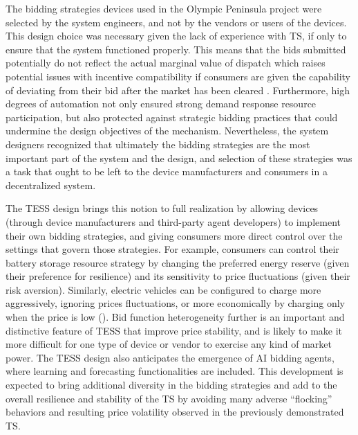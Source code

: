 The bidding strategies devices used in the Olympic Peninsula project were selected by the system engineers, and not by the vendors or users of the devices. This design choice was necessary given the lack of experience with TS, if only to ensure that the system functioned properly. 
This means that the bids submitted potentially do not reflect the actual marginal value of dispatch which raises potential issues with incentive compatibility if consumers are given the capability of deviating from their bid after the market has been cleared \citep{li2020transactive}. 
Furthermore, high degrees of automation not only ensured strong demand response resource participation, but also protected against strategic bidding practices that could undermine the design objectives of the mechanism.
Nevertheless, the system designers recognized that ultimately the bidding strategies are the most important part of the system and the design, and selection of these strategies was a task that ought to be left to the device manufacturers and consumers in a decentralized system.

The TESS design brings this notion to full realization by allowing devices (through device manufacturers and third-party agent developers) to implement their own bidding strategies, and giving consumers more direct control over the settings that govern those strategies. For example, consumers can control their battery storage resource strategy by changing the preferred energy reserve (given their preference for resilience) and its sensitivity to price fluctuations (given their risk aversion).  Similarly, electric vehicles can be configured to charge more aggressively, ignoring prices fluctuations, or more economically by charging only when the price is low (\cite{behboodi2016electric}). 
Bid function heterogeneity further is an important and distinctive feature of TESS that improve price stability, and is likely to make it more difficult for one type of device or vendor to exercise any kind of market power.
The TESS design also anticipates the emergence of AI bidding agents, where learning and forecasting functionalities are included. This development is expected to bring additional diversity in the bidding strategies and add to the overall resilience and stability of the TS by avoiding many adverse ``flocking'' behaviors and resulting price volatility observed in the previously demonstrated TS.

